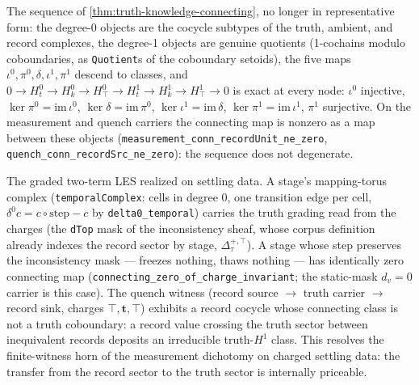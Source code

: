 \begin{theorem}\label{thm:graded-les-objects}\leanok{}
The sequence of \cref{thm:truth-knowledge-connecting}, no longer in representative form: the
degree-0 objects are the cocycle subtypes of the truth, ambient, and record complexes, the
degree-1 objects are genuine quotients (1-cochains modulo coboundaries, as \texttt{Quotient}s
of the coboundary setoids), the five maps $\iota^0, \pi^0, \delta, \iota^1, \pi^1$ descend to
classes, and $0\to H^0_t\to H^0_k\to H^0_\top\to H^1_t\to H^1_k\to H^1_\top\to 0$ is exact at
every node: $\iota^0$ injective, $\ker\pi^0 = \mathrm{im}\,\iota^0$,
$\ker\delta = \mathrm{im}\,\pi^0$, $\ker\iota^1 = \mathrm{im}\,\delta$,
$\ker\pi^1 = \mathrm{im}\,\iota^1$, $\pi^1$ surjective. On the measurement and quench
carriers the connecting map is nonzero as a map between these objects
(\texttt{measurement\_conn\_recordUnit\_ne\_zero},
\texttt{quench\_conn\_recordSrc\_ne\_zero}): the sequence does not degenerate.
\end{theorem}

\begin{theorem}\label{thm:quench-connecting}\leanok{}
The graded two-term LES realized on settling data. A stage's mapping-torus complex
(\texttt{temporalComplex}: cells in degree 0, one transition edge per cell,
$\delta^0 c = c\circ\mathrm{step} - c$ by \texttt{delta0\_temporal}) carries the truth grading
read from the charges (the \texttt{dTop} mask of the inconsistency sheaf, whose corpus
definition already indexes the record sector by stage, $\Delta^{+,\top}_\tau$). A stage whose
step preserves the inconsistency mask — freezes nothing, thaws nothing — has identically zero
connecting map (\texttt{connecting\_zero\_of\_charge\_invariant}; the static-mask
$d_v = 0$ carrier is this case). The quench witness (record source $\to$ truth carrier $\to$
record sink, charges $\top, \mathbf{t}, \top$) exhibits a record cocycle whose connecting class
is not a truth coboundary: a record value crossing the truth sector between inequivalent
records deposits an irreducible truth-$H^1$ class. This resolves the finite-witness horn of the
measurement dichotomy on charged settling data: the transfer from the record sector to the
truth sector is internally priceable.
\end{theorem}

